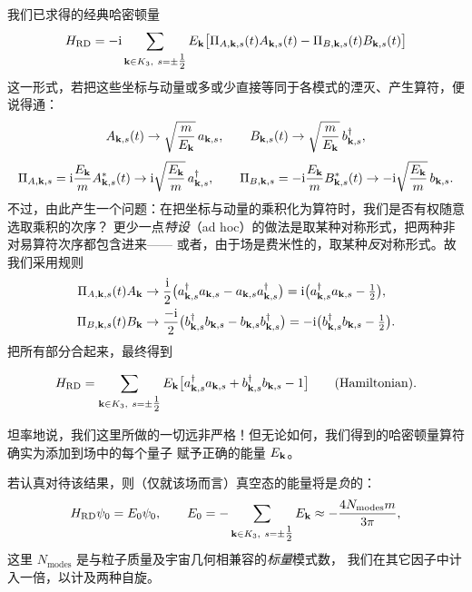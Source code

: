 我们已求得的经典哈密顿量
\begin{equation*}
H_{\text{RD}}=-\ii\sum_{\bk\in K_{3},\ s=\pm\tfrac12}E_{\bk}
\bigl[\Pi_{A,\bk,s}(t)A_{\bk,s}(t)-\Pi_{B,\bk,s}(t)B_{\bk,s}(t)\bigr]
\end{equation*}
这一形式，若把这些坐标与动量或多或少直接等同于各模式的湮灭、产生算符，便说得通：
\begin{equation*}
A_{\mathbf{k},s}(t)\to\sqrt{\frac{m}{E_{\mathbf{k}}}}\,a_{\mathbf{k},s},\qquad
B_{\mathbf{k},s}(t)\to\sqrt{\frac{m}{E_{\mathbf{k}}}}\,b^{\dagger}_{\mathbf{k},s},
\end{equation*}
\begin{equation*}
\Pi_{A,\mathbf{k},s}=\mathrm{i}\frac{E_{\mathbf{k}}}{m}A^{*}_{\mathbf{k},s}(t)\to\mathrm{i}\sqrt{\frac{E_{\mathbf{k}}}{m}}\,a^{\dagger}_{\mathbf{k},s},
\qquad
\Pi_{B,\mathbf{k},s}=-\mathrm{i}\frac{E_{\mathbf{k}}}{m}B^{*}_{\mathbf{k},s}(t)\to-\mathrm{i}\sqrt{\frac{E_{\mathbf{k}}}{m}}\,b_{\mathbf{k},s}.
\end{equation*}
不过，由此产生一个问题：在把坐标与动量的乘积化为算符时，我们是否有权随意选取乘积的次序？
更少一点\emph{特设}（ad hoc）的做法是取某种对称形式，把两种非对易算符次序都包含进来——
或者，由于场是费米性的，取某种\emph{反}对称形式。故我们采用规则
\begin{align*}
\Pi_{A,\mathbf{k},s}(t)A_{\mathbf{k}}&\to\frac{\mathrm{i}}{2}\bigl(a^{\dagger}_{\mathbf{k},s}a_{\mathbf{k},s}-a_{\mathbf{k},s}a^{\dagger}_{\mathbf{k},s}\bigr)
=\mathrm{i}\bigl(a^{\dagger}_{\mathbf{k},s}a_{\mathbf{k},s}-\tfrac12\bigr),\\
\Pi_{B,\mathbf{k},s}(t)B_{\mathbf{k}}&\to\frac{-\mathrm{i}}{2}\bigl(b^{\dagger}_{\mathbf{k},s}b_{\mathbf{k},s}-b_{\mathbf{k},s}b^{\dagger}_{\mathbf{k},s}\bigr)
=-\mathrm{i}\bigl(b^{\dagger}_{\mathbf{k},s}b_{\mathbf{k},s}-\tfrac12\bigr).
\end{align*}
把所有部分合起来，最终得到

\begin{keybox}[量子化后的黎曼狄拉克场]
\begin{equation*}
H_{\text{RD}}=\sum_{\bk\in K_{3},\ s=\pm\tfrac12}E_{\bk}
\bigl[a^{\dagger}_{\bk,s}a_{\bk,s}+b^{\dagger}_{\bk,s}b_{\bk,s}-1\bigr]
\qquad\text{(Hamiltonian)}.
\end{equation*}
\end{keybox}

坦率地说，我们这里所做的一切远非严格！但无论如何，我们得到的哈密顿量算符确实为添加到场中的每个量子
赋予正确的能量 $E_{\mathbf{k}}$。

若认真对待该结果，则（仅就该场而言）真空态的能量将是\emph{负}的：
\begin{equation*}
H_{\text{RD}}\psi_{0}=E_{0}\psi_{0},\qquad
E_{0}=-\sum_{\mathbf{k}\in K_{3},\ s=\pm\tfrac12}E_{\mathbf{k}}
\approx-\frac{4N_{\text{modes}}m}{3\pi},
\end{equation*}
这里 $N_{\text{modes}}$ 是与粒子质量及宇宙几何相兼容的\emph{标量}模式数，
我们在其它因子中计入一倍，以计及两种自旋。

